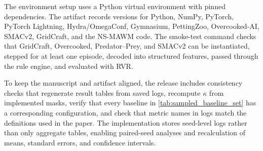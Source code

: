 \documentclass{article}
\theoremstyle{plain}
\theoremstyle{definition}
\theoremstyle{remark}
\begin{document}
\begin{table}[h!]
  \centering
  \footnotesize
  \caption{Reproduction command families. The artifact maps each table and figure to a concrete configuration list and output directory.}
  \label{tab:reproduction_commands}
\end{table}

The environment setup uses a Python virtual environment with pinned dependencies. The artifact records versions for Python, NumPy, PyTorch, PyTorch Lightning, Hydra/OmegaConf, Gymnasium, PettingZoo, Overcooked-AI, SMACv2, GridCraft, and the NS-MAWM code. The smoke-test command checks that GridCraft, Overcooked, Predator--Prey, and SMACv2 can be instantiated, stepped for at least one episode, decoded into structured features, passed through the rule engine, and evaluated with RVR.

To keep the manuscript and artifact aligned, the release includes consistency checks that regenerate result tables from saved logs, recompute $\kappa$ from implemented masks, verify that every baseline in \autoref{tab:sampled_baseline_set} has a corresponding configuration, and check that metric names in logs match the definitions used in the paper. The implementation stores seed-level logs rather than only aggregate tables, enabling paired-seed analyses and recalculation of means, standard errors, and confidence intervals.

\newpage

\end{document}
